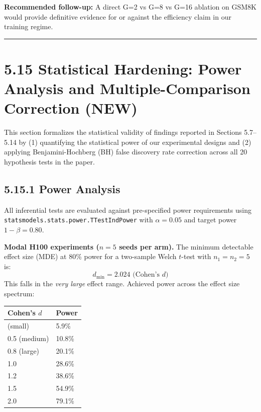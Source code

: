 \documentclass[
  american,
  11pt,
  a4paper,
  oneside]{report}
\newcounter{none} %
\begin{document}
\textbf{Recommended follow-up:} A direct G=2 vs G=8 vs G=16 ablation on
GSM8K would provide definitive evidence for or against the efficiency
claim in our training regime.

\begin{center}\rule{0.5\linewidth}{0.5pt}\end{center}

\section{5.15 Statistical Hardening: Power Analysis and
Multiple-Comparison Correction
(NEW)}\label{statistical-hardening-power-analysis-and-multiple-comparison-correction-new}

This section formalizes the statistical validity of findings reported in
Sections 5.7--5.14 by (1) quantifying the statistical power of our
experimental designs and (2) applying Benjamini-Hochberg (BH) false
discovery rate correction across all 20 hypothesis tests in the paper.

\subsection{5.15.1 Power Analysis}\label{power-analysis}

All inferential tests are evaluated against pre-specified power
requirements using \texttt{statsmodels.stats.power.TTestIndPower} with
\(\alpha = 0.05\) and target power \(1 - \beta = 0.80\).

\textbf{Modal H100 experiments (\(n = 5\) seeds per arm).} The minimum
detectable effect size (MDE) at 80\% power for a two-sample Welch
\(t\)-test with \(n_1 = n_2 = 5\) is:
\[d_{\min} = 2.024 \text{ (Cohen's } d\text{)}
\] This falls in the \emph{very large} effect range. Achieved power
across the effect size spectrum:

{\def\LTcaptype{none} %
\begin{longtable}[]{@{}ll@{}}
\toprule\noalign{}
Cohen's \(d\) & Power \\
\midrule\noalign{}
\endhead
\bottomrule\noalign{}
\endlastfoot
0.2 (small) & 5.9\% \\
0.5 (medium) & 10.8\% \\
0.8 (large) & 20.1\% \\
1.0 & 28.6\% \\
1.2 & 38.6\% \\
1.5 & 54.9\% \\
2.0 & 79.1\% \\
\end{longtable}
}
\end{document}
